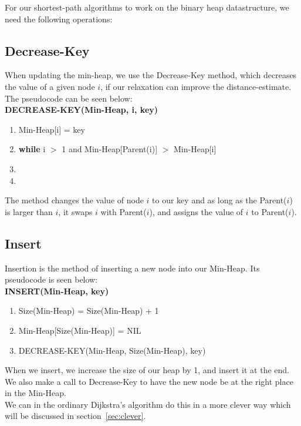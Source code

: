 \documentclass[11pt]{article}
\begin{document}
\noindent For our shortest-path algorithms to work on the binary heap datastructure, we need the following operations:

\newpage
\subsection{Decrease-Key}
When updating the min-heap, we use the Decrease-Key method, which decreases the value of a given node $i$, if our relaxation can improve the distance-estimate. The pseudocode can be seen below:\\

\textbf{DECREASE-KEY(Min-Heap, i, key)}
\begin{enumerate}
\setlength\itemsep{0em}
\item Min-Heap[i] = key
\item \textbf{while } i $>$ 1 and Min-Heap[Parent(i)] $>$ Min-Heap[i]
\item {}
\item {}
\end{enumerate}

\noindent The method changes the value of node $i$ to our key and as long as the Parent($i$) is larger than $i$, it swaps $i$ with Parent($i$), and assigns the value of $i$ to Parent($i$).\\


\subsection{Insert}
Insertion is the method of inserting a new node into our Min-Heap. Its pseudocode is seen below:\\

\textbf{INSERT(Min-Heap, key)}
\begin{enumerate}
\setlength\itemsep{0em}
\item Size(Min-Heap) = Size(Min-Heap) + 1
\item Min-Heap[Size(Min-Heap)] = NIL
\item DECREASE-KEY(Min-Heap, Size(Min-Heap), key)
\end{enumerate}

\noindent When we insert, we increase the size of our heap by 1, and insert it at the end. We also make a call to Decrease-Key to have the new node be at the right place in the Min-Heap.\\

\noindent We can in the ordinary Dijkstra's algorithm do this in a more clever way which will be discussed in section~\ref{sec:clever}.
\end{document}
